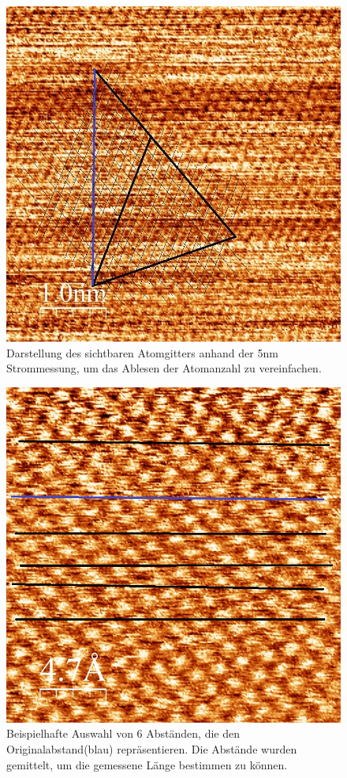 \documentclass[12pt,a4paper]{article}
\begin{document}
\begin{figure}
\centering
\includegraphics[scale=0.5]{Bilder/Atome/strom5_v_gitter.jpg}
\caption{Darstellung des sichtbaren Atomgitters anhand der 5nm Strommessung, um das Ablesen der Atomanzahl zu vereinfachen.}
\label{fig:strom5_symmetire}
\end{figure}

\begin{figure}
\centering
\includegraphics[scale=0.5]{Bilder/Atome/hoch2_abstand.jpg}
\caption{Beispielhafte Auswahl von 6 Abständen, die den Originalabstand(blau) repräsentieren. Die Abstände wurden gemittelt, um die gemessene Länge bestimmen zu können.}
\label{fig:strom2_abstand}
\end{figure}
\end{document}
